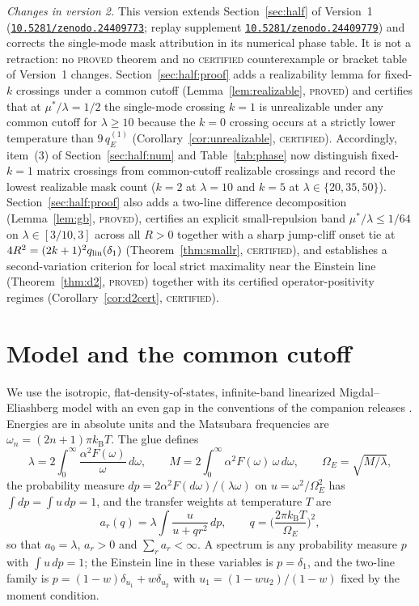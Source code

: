 \documentclass[11pt]{article}
\newcommand{\DOI}[1]{\mbox{\href{https://doi.org/#1}{\nolinkurl{#1}}}}
\newcommand{\kb}{k_{\mathrm B}}
\newcommand{\OmE}{\Omega_E}
\newcommand{\muS}{\mu^{*}}
\theoremstyle{definition}
\theoremstyle{remark}
\begin{document}
\emph{Changes in version 2.} This version extends Section~\ref{sec:half} of Version~1
(\DOI{10.5281/zenodo.24409773}; replay supplement \DOI{10.5281/zenodo.24409779}) and
corrects the single-mode mask attribution in its numerical phase table. It is not a
retraction: no \textsc{proved} theorem and no \textsc{certified} counterexample or bracket
table of Version~1 changes. Section~\ref{sec:half:proof} adds a realizability lemma for
fixed-$k$ crossings under a common cutoff (Lemma~\ref{lem:realizable}, \textsc{proved})
and certifies that at $\muS/\lambda=1/2$ the single-mode crossing $k=1$ is unrealizable
under any common cutoff for $\lambda\ge10$ because the $k=0$ crossing occurs at a strictly
lower temperature than $9\,q_E^{(1)}$ (Corollary~\ref{cor:unrealizable},
\textsc{certified}). Accordingly, item~(3) of Section~\ref{sec:half:num} and
Table~\ref{tab:phase} now distinguish fixed-$k=1$ matrix crossings from common-cutoff
realizable crossings and record the lowest realizable mask count ($k=2$ at $\lambda=10$
and $k=5$ at $\lambda\in\{20,35,50\}$). Section~\ref{sec:half:proof} also adds a two-line
difference decomposition (Lemma~\ref{lem:gb}, \textsc{proved}), certifies an explicit
small-repulsion band $\muS/\lambda\le1/64$ on $\lambda\in[3/10,3]$ across all $R>0$
together with a sharp jump-cliff onset tie at $4R^2=(2k+1)^2q_{\rm lin}(\delta_1)$
(Theorem~\ref{thm:smallr}, \textsc{certified}), and establishes a second-variation
criterion for local strict maximality near the Einstein line
(Theorem~\ref{thm:d2}, \textsc{proved}) together with its certified operator-positivity
regimes (Corollary~\ref{cor:d2cert}, \textsc{certified}).

\section{Model and the common cutoff}\label{sec:model}

We use the isotropic, flat-density-of-states, infinite-band linearized Migdal--Eliashberg
model with an even gap in the conventions of the companion releases
\cite{finiteband,univglue}. Energies are in absolute units and the Matsubara frequencies
are $\omega_n=(2n+1)\pi\kb T$. The glue defines
\begin{equation}\label{eq:const}
\lambda=2\int_0^\infty\frac{\alpha^2F(\omega)}{\omega}\,d\omega,\qquad
M=2\int_0^\infty\alpha^2F(\omega)\,\omega\,d\omega,\qquad
\OmE=\sqrt{M/\lambda},
\end{equation}
the probability measure $dp=2\alpha^2F(d\omega)/(\lambda\omega)$ on
$u=\omega^2/\OmE^2$ has $\int dp=\int u\,dp=1$, and the transfer weights at temperature
$T$ are
\begin{equation}\label{eq:transfers}
a_r(q)=\lambda\int\frac{u}{u+qr^2}\,dp,\qquad q=\Big(\frac{2\pi\kb T}{\OmE}\Big)^2,
\end{equation}
so that $a_0=\lambda$, $a_r>0$ and $\sum_r a_r<\infty$. A spectrum is any probability
measure $p$ with $\int u\,dp=1$; the Einstein line in these variables is
$p=\delta_1$, and the two-line family is $p=(1-w)\delta_{u_1}+w\delta_{u_2}$ with
$u_1=(1-wu_2)/(1-w)$ fixed by the moment condition.
\end{document}
